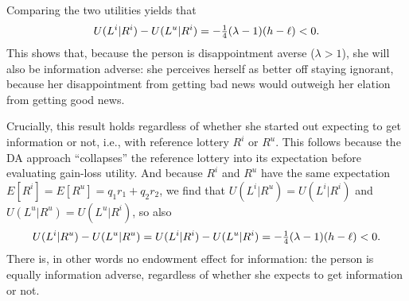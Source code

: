 Comparing the two utilities yields that
\begin{equation*}
  U(L^i|R^i) - U(L^u|R^i) = -\tfrac{1}{4}(\lambda-1)(h-\ell) < 0.
\end{equation*}
This shows that, because the person is disappointment averse ($\lambda > 1$),
she will also be information adverse: she perceives herself as better off
staying ignorant, because her disappointment from getting bad news would
outweigh her elation from getting good news.

Crucially, this result holds regardless of whether she started out expecting
to get information or not, i.e., with reference lottery $R^i$ or $R^u$. This
follows because the DA approach ``collapses'' the reference lottery into its
expectation before evaluating gain-loss utility. And because $R^i$ and $R^u$
have the same expectation $E[R^i] = E[R^u] = q_1r_1 + q_2r_2$, we find that
$U(L^i|R^u) = U(L^i|R^i)$ and $U(L^u|R^u) = U(L^u|R^i)$, so also
\begin{equation*}
  U(L^i|R^u) - U(L^u|R^u) = U(L^i|R^i) - U(L^u|R^i) = -\tfrac{1}{4}(\lambda-1)(h-\ell) < 0.
\end{equation*}
There is, in other words no endowment effect for information: the person is
equally information adverse, regardless of whether she expects to get
information or not.

